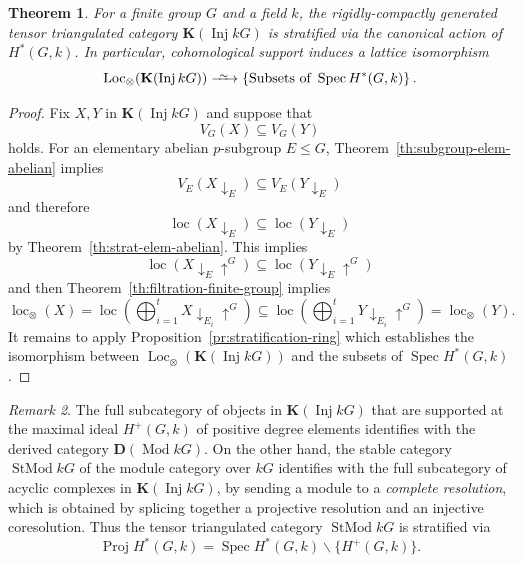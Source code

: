 \documentclass{amsart}[a4]
\newtheorem{theorem}{Theorem}[section]
\theoremstyle{definition}
\theoremstyle{remark}
\newtheorem{remark}[theorem]{Remark}
\numberwithin{equation}{section}
\newcommand{\Inj}{\operatorname{Inj}}
\newcommand{\loc}{\operatorname{loc}}
\newcommand{\Loc}{\operatorname{Loc}}
\newcommand{\Mod}{\operatorname{Mod}}
\newcommand{\Proj}{\operatorname{Proj}}
\newcommand{\Spec}{\operatorname{Spec}}
\newcommand{\StMod}{\operatorname{StMod}}
\newcommand{\da}{{\downarrow}}
\newcommand{\longiso}{\xrightarrow{\
    \raisebox{-.6ex}[0ex][0ex]{$\scriptstyle{\sim}$}\ }}
\newcommand{\ua}{{\uparrow}}
\newcommand{\bfD}{\mathbf D}
\newcommand{\bfK}{\mathbf K}
\begin{document}
\begin{theorem}\label{th:strat-finite-group}
  For a finite group $G$ and a field $k$, the rigidly-compactly generated tensor triangulated category $\bfK(\Inj kG)$ is
  stratified via the canonical action of $H^*(G,k)$. In
  particular, cohomological support induces a lattice isomorphism
  \begin{equation*}
    \Loc_\otimes(\bfK(\Inj kG))\longiso\{\text{Subsets of }\Spec H^*(G,k)\}\,.
  \end{equation*}
\end{theorem}
\begin{proof}
Fix $X,Y$ in $\bfK(\Inj kG)$ and suppose that \[V_G(X)\subseteq V_G(Y)\]
  holds. For an elementary abelian $p$-subgroup $E\le G$,
 Theorem~\ref{th:subgroup-elem-abelian} implies
 \[V_E(X\da_E)\subseteq V_E(Y\da_E)\]
 and therefore \[\loc(X\da_E)\subseteq\loc(Y\da_E)\] by
 Theorem~\ref{th:strat-elem-abelian}. This implies
 \[\loc(X\da_E\ua^G)\subseteq \loc(Y\da_E\ua^G)\]
 and then Theorem~\ref{th:filtration-finite-group} implies
 \[\loc_\otimes(X)=\loc\left(\bigoplus_{i=1}^t X\da_{E_i}\ua^G\right)
   \subseteq \loc\left(\bigoplus_{i=1}^t
     Y\da_{E_i}\ua^G\right)=\loc_\otimes(Y).\] It remains to apply
 Proposition~\ref{pr:stratification-ring} which establishes the
 isomorphism between $\Loc_\otimes(\bfK(\Inj kG))$ and the subsets of
 $\Spec H^*(G,k)$.
\end{proof}


\begin{remark}
  The full subcategory of objects in $\bfK(\Inj kG)$ that are supported
  at the maximal ideal $H^+(G,k)$ of positive degree elements
  identifies with the derived category $\bfD(\Mod kG)$. On the other
  hand, the stable category $\StMod kG$ of the module category over
  $kG$ identifies with the full subcategory of acyclic complexes in
  $\bfK(\Inj kG)$, by sending a module to a \emph{complete resolution}, which
  is obtained by splicing together a projective resolution and an injective
  coresolution. Thus the tensor triangulated category $\StMod kG$ is
  stratified via
  \[\Proj H^*(G,k)=\Spec H^*(G,k)\smallsetminus\{H^+(G,k)\}.\]
\end{remark}
\end{document}
